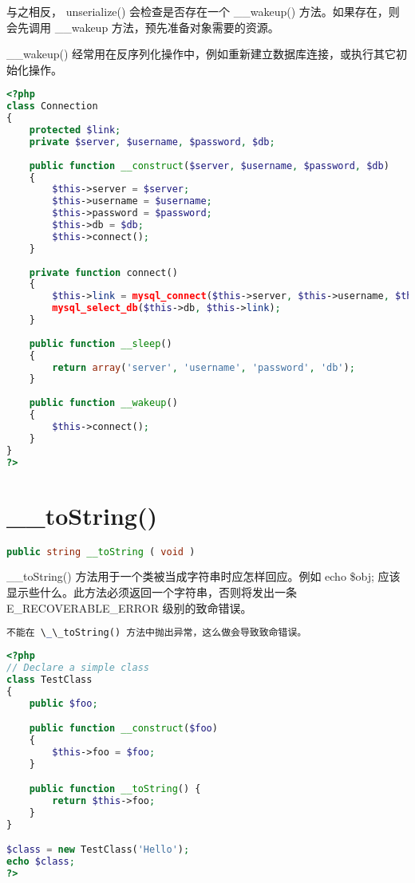 与之相反， unserialize() 会检查是否存在一个 \_\_wakeup() 方法。如果存在，则会先调用 \_\_wakeup 方法，预先准备对象需要的资源。

\_\_wakeup() 经常用在反序列化操作中，例如重新建立数据库连接，或执行其它初始化操作。


\begin{lstlisting}[language=PHP]
<?php
class Connection 
{
    protected $link;
    private $server, $username, $password, $db;
    
    public function __construct($server, $username, $password, $db)
    {
        $this->server = $server;
        $this->username = $username;
        $this->password = $password;
        $this->db = $db;
        $this->connect();
    }
    
    private function connect()
    {
        $this->link = mysql_connect($this->server, $this->username, $this->password);
        mysql_select_db($this->db, $this->link);
    }
    
    public function __sleep()
    {
        return array('server', 'username', 'password', 'db');
    }
    
    public function __wakeup()
    {
        $this->connect();
    }
}
?>
\end{lstlisting}

\section{\_\_toString()}


\begin{lstlisting}[language=PHP]
public string __toString ( void )
\end{lstlisting}

\_\_toString() 方法用于一个类被当成字符串时应怎样回应。例如 echo \$obj; 应该显示些什么。此方法必须返回一个字符串，否则将发出一条 E\_RECOVERABLE\_ERROR 级别的致命错误。

\begin{lstlisting}[language=PHP]
不能在 \_\_toString() 方法中抛出异常，这么做会导致致命错误。
\end{lstlisting}


\begin{lstlisting}[language=PHP]
<?php
// Declare a simple class
class TestClass
{
    public $foo;

    public function __construct($foo) 
    {
        $this->foo = $foo;
    }

    public function __toString() {
        return $this->foo;
    }
}

$class = new TestClass('Hello');
echo $class;
?>
\end{lstlisting}

